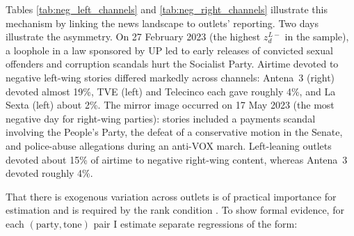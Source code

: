 \documentclass[12pt]{article}
\begin{document}
	Tables \ref{tab:neg_left_channels} and \ref{tab:neg_right_channels} illustrate this mechanism by linking the news landscape to outlets’ reporting. Two days illustrate the asymmetry. On {27 February 2023} (the highest $z_d^{L-}$ in the sample), a loophole in a law sponsored by UP led to early releases of convicted sexual offenders and corruption scandals hurt the Socialist Party. Airtime devoted to negative left-wing stories differed markedly across channels: Antena~3 (right) devoted almost 19\%, TVE (left) and Telecinco each gave roughly 4\%, and La Sexta (left) about 2\%. The mirror image occurred on {17 May 2023} (the most negative day for right-wing parties): stories included a payments scandal involving the People’s Party, the defeat of a conservative motion in the Senate, and police-abuse allegations during an anti-VOX march. Left-leaning outlets devoted about 15\% of airtime to negative right-wing content, whereas Antena~3 devoted roughly 4\%.
	
	That there is exogenous variation across outlets is of practical importance for estimation and is required by the rank condition \citep{berry_haile_econometrica}. To show formal evidence, for each $(\text{party},\text{tone})$ pair I estimate separate regressions of the form:
	
	
	
	
	
	
	
	
\end{document}
